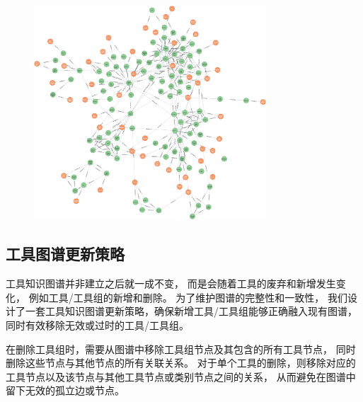 \begin{figure}[H]
    \vspace{1em}
    \centering
    \setlength{\abovecaptionskip}{10pt} %
    \includegraphics[height=8cm]{../assets/Neo4j工具图1126-150nodes.png}
    \label{fig:ch3-neo4j}
\end{figure}

\subsection{工具图谱更新策略}

工具知识图谱并非建立之后就一成不变，
而是会随着工具的废弃和新增发生变化，
例如工具/工具组的新增和删除。
为了维护图谱的完整性和一致性，
我们设计了一套工具知识图谱更新策略，确保新增工具/工具组能够正确融入现有图谱，同时有效移除无效或过时的工具/工具组。

在删除工具组时，需要从图谱中移除工具组节点及其包含的所有工具节点，
同时删除这些节点与其他节点的所有关联关系。
对于单个工具的删除，则移除对应的工具节点以及该节点与其他工具节点或类别节点之间的关系，
从而避免在图谱中留下无效的孤立边或节点。

